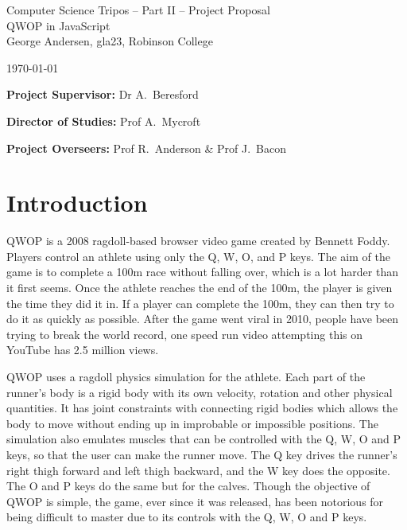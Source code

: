\documentclass[12pt,a4paper,twoside]{article}
\begin{document}
\begin{center}
\Large
Computer Science Tripos -- Part II -- Project Proposal\\[4mm]
\LARGE
QWOP in JavaScript \\[4mm]

\large
George Andersen, gla23, Robinson College

\today

\end{center}

\vspace{5mm}

\textbf{Project Supervisor:} Dr A.~Beresford

\textbf{Director of Studies:} Prof A.~Mycroft

\textbf{Project Overseers:} Prof R.~Anderson \& Prof J.~Bacon


\section*{Introduction}

QWOP is a 2008 ragdoll-based browser video game created by Bennett Foddy. Players control an athlete using only the Q, W, O, and P keys. The aim of the game is to complete a 100m race without falling over, which is a lot harder than it first seems. 
Once the athlete reaches the end of the 100m, the player is given the time they did it in. If a player can complete the 100m, they can then try to do it as quickly as possible. After the game went viral in 2010, people have been trying to break the world record, one speed run video attempting this on YouTube has 2.5 million views.

QWOP uses a ragdoll physics simulation for the athlete. Each part of the runner's body is a rigid body with its own velocity, rotation and other physical quantities. It has joint constraints with connecting rigid bodies which allows the body to move without ending up in improbable or impossible positions.
The simulation also emulates muscles that can be controlled with the Q, W, O and P keys, so that the user can make the runner move. The Q key drives the runner's right thigh forward and left thigh backward, and the W key does the opposite. The O and P keys do the same but for the calves.
Though the objective of QWOP is simple, the game, ever since it was released, has been notorious for being difficult to master due to its controls with the Q, W, O and P keys.
\end{document}
